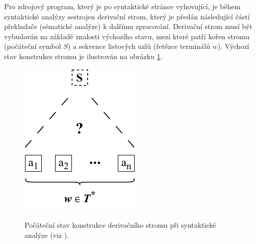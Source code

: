 Pro zdrojový program, který je po syntaktické stránce vyhovující, je během syntaktické analýzy sestrojen derivační strom, který je předán následující částí
překladače (sématické analýze) k dalšímu zpracování. Derivační strom musí být vybudován na základě znalosti výchozího stavu, mezi které patří kořen stromu (počáteční symbol $S$)
a sekvence listových uzlů (řetězce terminálů $w$). Výchozí stav konstrukce stromu je ilustrován na obrázku \ref{obrPocatecniStavSA}.

\begin{figure}[h]\centering
  \centering
  \includegraphics[scale=1.1]{obrazky/PocatectniStavDerivStromu.pdf}\\[1pt]

  \caption{Počáteční stav konstrukce derivačního stromu při syntaktické analýze (viz \cite{Meduna:2000:AutomataAndLanguages}).}
  \label{obrPocatecniStavSA}
\end{figure}

